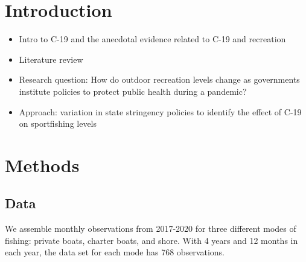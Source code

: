\documentclass[10pt,letterpaper]{article}
\providecommand{\tightlist}{%
  \setlength{\itemsep}{0pt}\setlength{\parskip}{0pt}}
\begin{document}
\hypertarget{introduction}{%
\section{Introduction}\label{introduction}}

\begin{itemize}
\tightlist
\item
  Intro to C-19 and the anecdotal evidence related to C-19 and
  recreation
\item
  Literature review
\item
  Research question: How do outdoor recreation levels change as
  governments institute policies to protect public health during a
  pandemic?
\item
  Approach: variation in state stringency policies to identify the
  effect of C-19 on sportfishing levels
\end{itemize}

\hypertarget{methods}{%
\section{Methods}\label{methods}}

\hypertarget{data}{%
\subsection{Data}\label{data}}

We assemble monthly observations from 2017-2020 for three different
modes of fishing: private boats, charter boats, and shore. With 4 years
and 12 months in each year, the data set for each mode has 768
observations.
\end{document}
